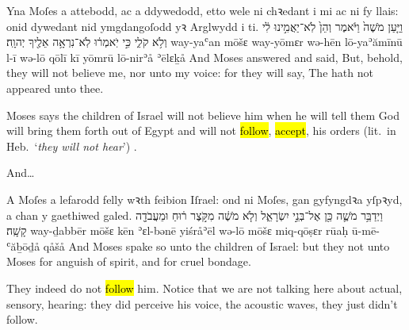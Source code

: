 \begin{example}{2}{4}{1}{}{}
	\quoling
	{Yna Moſes a attebodd, ac a ddywedodd, etto wele ni chꝛedant i mi ac ni   fy llais: onid dywedant nid ymgdangoſodd yꝛ Arglwydd i ti.}
	{וַיַּ֤עַן מֹשֶׁה֙ וַיֹּ֔אמֶר וְהֵן֙ לֹֽא־יַאֲמִ֣ינוּ לִ֔י וְלֹ֥א  קֹלִ֑י כִּ֣י יֹֽאמְר֔וּ לֹֽא־נִרְאָ֥ה אֵלֶ֖יךָ יְהוָֽה׃}
	{way-yaʿan mōšɛ way-yōmɛr wə-hēn lō-yaʾămīnū l-ī wə-lō  qōlī kī yōmrū lō-nirʾå ʾēlɛḵå {\YHWH}}
	{And Moses answered and said, But, behold, they will not believe me, nor  {unto} my voice: for they will say, The {\LORD} hath not appeared unto thee.}
\end{example}
\begin{paper}
	\explain Moses says the children of Israel will not believe him when he will tell them God will bring them forth out of Egypt and will not \hl{follow}, \hl{accept}, his orders (lit.\ in Heb.~‘\textit{they will not hear}’) .
\end{paper}

\begin{paper}
	And…
\end{paper}
\begin{example}{2}{6}{9}{}{}
	\quoling
	{A Moſes a lefarodd felly wꝛth feibion Iſrael: ond ni   Moſes, gan gyfyngdꝛa yſpꝛyd, a chan y gaethiwed galed.}
	{וַיְדַבֵּ֥ר מֹשֶׁ֛ה כֵּ֖ן אֶל־בְּנֵ֣י יִשְׂרָאֵ֑ל וְלֹ֤א  מֹשֶׁ֔ה מִקֹּ֣צֶר ר֔וּחַ וּמֵעֲבֹדָ֖ה קָשָֽׁה׃}
	{way-ḏabbēr mōšɛ kēn ʾɛl-bənē yiśråʾēl wə-lō  mōšɛ miq-qōṣɛr rūaḥ ū-mē-ʿăḇōḏå qåšå}
	{And Moses spake so unto the children of Israel: but they  not {unto} Moses for anguish of spirit, and for cruel bondage.}
\end{example}
\begin{paper}
	\explain They indeed do not \hl{follow} him. Notice that we are not talking here about actual, sensory, hearing: they did perceive his voice, the acoustic waves, they just didn't follow.
\end{paper}

